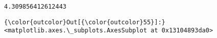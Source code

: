 \documentclass[11pt]{article}
\begin{document}
    \begin{Verbatim}[commandchars=\\\{\}]
4.309856412612443

    \end{Verbatim}

\begin{Verbatim}[commandchars=\\\{\}]
{\color{outcolor}Out[{\color{outcolor}55}]:} <matplotlib.axes.\_subplots.AxesSubplot at 0x13104893da0>
\end{Verbatim}
            
    \begin{center}
    \end{center}
    { \hspace*{\fill} \\}
    
\end{document}
